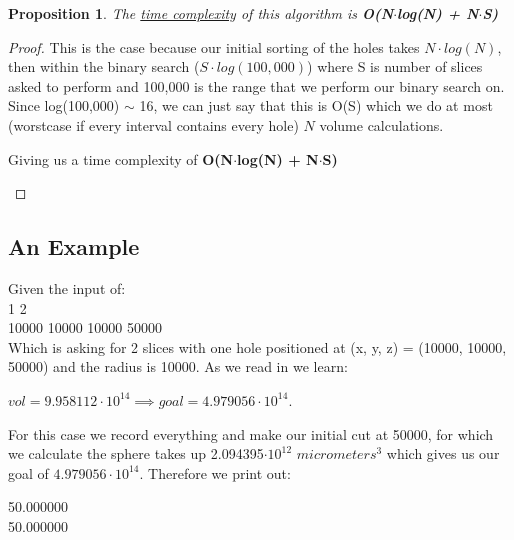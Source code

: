 \documentclass[12pt]{article}
\newtheorem{proposition}[theorem]{Proposition}
\begin{document}
\begin{proposition}
\label{numq}
The \underline{time complexity} of this algorithm is \textbf{O(N$\cdot$log(N) + N$\cdot$S)}
\end{proposition}

\begin{proof}
This is the case because our initial sorting of the holes takes $N\cdot log(N)$, then within the binary
search ($S\cdot log(100,000)$) where S is number of slices asked to perform and 100,000 is the range that
we perform our binary search on. Since log(100,000) $\sim$ 16, we can just say that this is O(S) which
we do at most (worstcase if every interval contains every hole) $N$ volume calculations.
\begin{center}
    Giving us a time complexity of \textbf{O(N$\cdot$log(N) + N$\cdot$S)}
\end{center}
\end{proof}


\subsection{An Example}
Given the input of:  \\
1 2                         \\
10000 10000 10000 50000     \\

Which is asking for 2 slices with one hole positioned at (x, y, z) = (10000, 10000, 50000) and the
radius is 10000. As we read in we learn:
\begin{center}$vol = 9.958112\cdot10^{14} \implies goal = 4.979056\cdot10^{14}$.\end{center}
For this case we record everything and make our initial cut at 50000, for which we calculate the sphere
takes up 2.094395$\cdot10^{12}$ $micrometers^3$ which gives us our goal of $4.979056\cdot10^{14}$. Therefore
we print out:
\begin{center}50.000000 \\
50.000000\end{center}

\newpage
\end{document}
